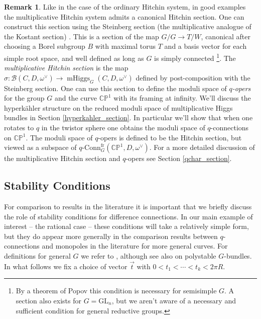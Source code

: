 \documentclass[11pt, oneside, reqno]{amsart}
\theoremstyle{definition} \newtheorem{definition}{Definition}[section]
\theoremstyle{definition} \newtheorem{remark}[definition]{Remark}
\theoremstyle{definition} \newtheorem{remarks}[definition]{Remarks}
\theoremstyle{definition} \newtheorem{question}[definition]{Question}
\theoremstyle{definition} \newtheorem*{note}{Note}
\theoremstyle{definition} \newtheorem{example}[definition]{Example}
\theoremstyle{definition} \newtheorem{examples}[definition]{Examples}
\newcommand{\bb}[1]{\mathbb{#1}}
\newcommand{\mc}[1]{\mathcal{#1}}
\newcommand{\GL}{\mathrm{GL}}
\DeclareMathOperator{\mhiggs}{mHiggs}
\newcommand{\qconn}{q\text{-Conn}}
\newcommand{\fr}{\mathrm{fr}}
\begin{document}
\begin{remark} \label{q_opers_remark}
Like in the case of the ordinary Hitchin system, in good examples the multiplicative Hitchin system admits a canonical Hitchin section.  One can construct this section using the Steinberg section (the multiplicative analogue of the Kostant section) \cite{Steinberg}.  This is a section of the map $G/G \to T/W$, canonical after choosing a Borel subgroup $B$ with maximal torus $T$ and a basis vector for each simple root space, and well defined as long as $G$ is simply connected \footnote{By a theorem of Popov \cite{Popov} this condition is necessary for semisimple $G$.  A section also exists for $G = \GL_n$, but we aren't aware of a necessary and sufficient condition for general reductive groups.}.  The \emph{multiplicative Hitchin section} is the map $\sigma \colon \mc B(C,D,\omega^\vee) \to \mhiggs_G(C,D,\omega^\vee)$ defined by post-composition with the Steinberg section.  One can use this section to define the moduli space of \emph{$q$-opers} for the group $G$ and the curve $\bb{CP}^1$ with its framing at infinity.  We'll discuss the hyperk\"ahler structure on the reduced moduli space of multiplicative Higgs bundles in Section \ref{hyperkahler_section}.  In particular we'll show that when one rotates to $q$ in the twistor sphere one obtains the moduli space of $q$-connections on $\bb{CP}^1$.  The moduli space of $q$-opers is defined to be the Hitchin section, but viewed as a subspace of $\qconn^{\fr}_G(\bb{CP}^1,D,\omega^\vee)$.  For a more detailed discussion of the multiplicative Hitchin section and $q$-opers see Section \ref{qchar_section}. 
\end{remark}

\subsection{Stability Conditions} \label{stability_section}
For comparison to results in the literature it is important that we briefly discuss the role of stability conditions for difference connections.  In our main example of interest -- the rational case -- these conditions will take a relatively simple form, but they do appear more generally in the comparison results between $q$-connections and monopoles in the literature for more general curves.  For definitions for general $G$ we refer to \cite{Smith}, although see also \cite{AnchoucheBiswas} on polystable $G$-bundles.  In what follows we fix a choice of vector $\overrightarrow{t}$ with $0 < t_1 < \cdots < t_k < 2\pi R$.
\end{document}

